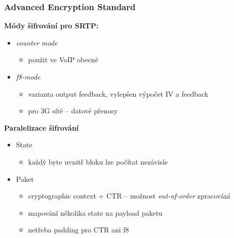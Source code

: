 \documentclass[10pt, xcolor=pdflatex, dvipsnames, table]{beamer}
\begin{document}
\begin{frame}
\frametitle{Advanced Encryption Standard}
\textbf{Módy šifrování pro SRTP:} 
\begin{itemize}
\item \textit{counter mode}
    \begin{itemize}
        \item použit ve VoIP obecně
    \end{itemize}
\item \textit{f8-mode} 
\begin{itemize}
    \item varianta output feedback, vylepšen výpočet IV a feedback
    \item pro 3G sítě -- datové přenosy
\end{itemize}
\end{itemize}

\vspace{1em}

\textbf{Paralelizace šifrování}

\begin{itemize}
\item State 
    \begin{itemize}
    \item každý byte uvnitř bloku lze počítat nezávisle
    \end{itemize}
\item Paket
    \begin{itemize}
    \item cryptographic context + CTR -- možnost \textit{out-of-order} zpracování
    \item mapování několika state na payload paketu
    \item netřeba padding pro CTR ani f8
    \end{itemize}
\end{itemize}
\end{frame}
\end{document}
